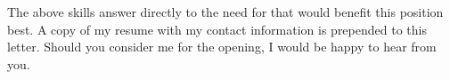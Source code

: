 The above skills answer directly to the need for \jobrequirement{} that would benefit this position best. 
A copy of my resume with my contact information is prepended to this letter. 
Should you consider me for the \position{} opening, 
I would be happy to hear from you. 
